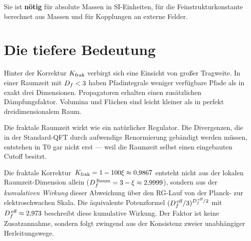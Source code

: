 Sie ist \textbf{nötig} für absolute Massen in SI-Einheiten, für die Feinstrukturkonstante berechnet aus Massen und für Kopplungen an externe Felder.

\section{Die tiefere Bedeutung}

Hinter der Korrektur $K_{\text{frak}}$ verbirgt sich eine Einsicht von großer Tragweite. In einer Raumzeit mit $D_f < 3$ haben Pfadintegrale weniger verfügbare Pfade als in exakt drei Dimensionen. Propagatoren erhalten einen zusätzlichen Dämpfungsfaktor. Volumina und Flächen sind leicht kleiner als in perfekt dreidimensionalem Raum.

Die fraktale Raumzeit wirkt wie ein natürlicher Regulator. Die Divergenzen, die in der Standard-QFT durch aufwendige Renormierung gebändigt werden müssen, entstehen in T0 gar nicht erst --- weil die Raumzeit selbst einen eingebauten Cutoff besitzt.

\begin{zusammenfassung}
Die fraktale Korrektur~$K_{\text{frak}} = 1 - 100\xi \approx 0{,}9867$ entsteht nicht aus der lokalen Raumzeit-Dimension allein ($D_f^{\,\text{Raum}} = 3 - \xi \approx 2{,}9999$), sondern aus der \emph{kumulativen Wirkung} dieser Abweichung über den RG-Lauf von der Planck- zur elektroschwachen Skala. Die äquivalente Potenzformel $(D_f^{\,\text{eff}}/3)^{D_f^{\,\text{eff}}/2}$ mit $D_f^{\,\text{eff}} \approx 2{,}973$ beschreibt diese kumulative Wirkung. Der Faktor ist keine Zusatzannahme, sondern folgt zwingend aus der Konsistenz zweier unabhängiger Herleitungswege.
\end{zusammenfassung}
